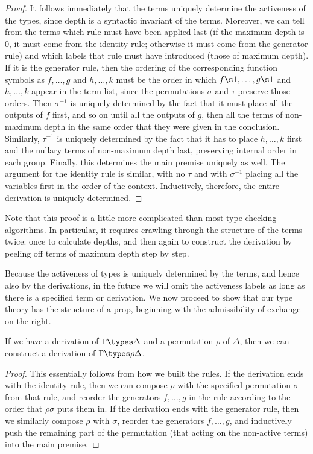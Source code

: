 \begin{proof}
  It follows immediately that the terms uniquely determine the activeness of the types, since depth is a syntactic invariant of the terms.
  Moreover, we can tell from the terms which rule must have been applied last (if the maximum depth is $0$, it must come from the identity rule; otherwise it must come from the generator rule) and which labels that rule must have introduced (those of maximum depth).
  If it is the generator rule, then the ordering of the corresponding function symbols as $f,\dots,g$ and $h,\dots,k$ must be the order in which $f\s1,\dots,g\s1$ and $h,\dots,k$ appear in the term list, since the permutations $\sigma$ and $\tau$ preserve those orders.
  Then $\sigma^{-1}$ is uniquely determined by the fact that it must place all the outputs of $f$ first, and so on until all the outputs of $g$, then all the terms of non-maximum depth in the same order that they were given in the conclusion.
  Similarly, $\tau^{-1}$ is uniquely determined by the fact that it has to place $h,\dots,k$ first and the nullary terms of non-maximum depth last, preserving internal order in each group.
  Finally, this determines the main premise uniquely as well.
  The argument for the identity rule is similar, with no $\tau$ and with $\sigma^{-1}$ placing all the variables first in the order of the context.
  Inductively, therefore, the entire derivation is uniquely determined.
\end{proof}

Note that this proof is a little more complicated than most type-checking algorithms.
In particular, it requires crawling through the structure of the terms twice: once to calculate depths, and then again to construct the derivation by peeling off terms of maximum depth step by step.

Because the activeness of types is uniquely determined by the terms, and hence also by the derivations, in the future we will omit the activeness labels as long as there is a specified term or derivation.
We now proceed to show that our type theory has the structure of a prop, beginning with the admissibility of exchange on the right.

\begin{lem}\label{thm:prop-symadm}
  If we have a derivation of $\Gamma\types \Delta$ and a permutation $\rho$ of $\Delta$, then we can construct a derivation of $\Gamma\types \rho\Delta$.
\end{lem}
\begin{proof}
  This essentially follows from how we built the rules.
  If the derivation ends with the identity rule, then we can compose $\rho$ with the specified permutation $\sigma$ from that rule, and reorder the generators $f,\dots,g$ in the rule according to the order that $\rho\sigma$ puts them in.
  If the derivation ends with the generator rule, then we similarly compose $\rho$ with $\sigma$, reorder the generators $f,\dots,g$, and inductively push the remaining part of the permutation (that acting on the non-active terms) into the main premise.
\end{proof}

